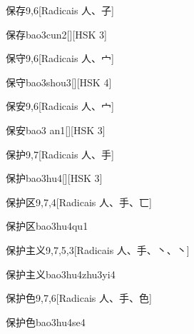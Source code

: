 \begin{entry}{保存}{9,6}[Radicais ⼈、⼦]
  \begin{phonetics}{保存}{bao3cun2}[][HSK 3]
  \end{phonetics}
\end{entry}

\begin{entry}{保守}{9,6}[Radicais ⼈、⼧]
  \begin{phonetics}{保守}{bao3shou3}[][HSK 4]
  \end{phonetics}
\end{entry}

\begin{entry}{保安}{9,6}[Radicais ⼈、⼧]
  \begin{phonetics}{保安}{bao3 an1}[][HSK 3]
  \end{phonetics}
\end{entry}

\begin{entry}{保护}{9,7}[Radicais ⼈、⼿]
  \begin{phonetics}{保护}{bao3hu4}[][HSK 3]
  \end{phonetics}
\end{entry}

\begin{entry}{保护区}{9,7,4}[Radicais ⼈、⼿、⼖]
  \begin{phonetics}{保护区}{bao3hu4qu1}
  \end{phonetics}
\end{entry}

\begin{entry}{保护主义}{9,7,5,3}[Radicais ⼈、⼿、⼂、⼂]
  \begin{phonetics}{保护主义}{bao3hu4zhu3yi4}
  \end{phonetics}
\end{entry}

\begin{entry}{保护色}{9,7,6}[Radicais ⼈、⼿、⾊]
  \begin{phonetics}{保护色}{bao3hu4se4}
  \end{phonetics}
\end{entry}

